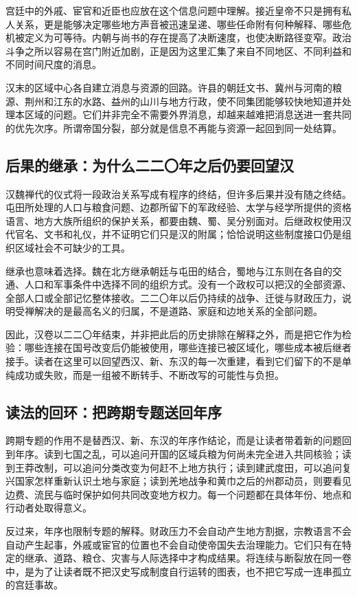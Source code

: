 宫廷中的外戚、宦官和近臣也应放在这个信息问题中理解。接近皇帝不只是拥有私人关系，更是能够决定哪些地方声音被迅速呈递、哪些任命附有何种解释、哪些危机被定义为可等待。内朝与尚书的存在提高了决断速度，也使决断路径变窄。政治斗争之所以容易在宫门附近加剧，正是因为这里汇集了来自不同地区、不同利益和不同时间尺度的消息。

汉末的区域中心各自建立消息与资源的回路。许县的朝廷文书、冀州与河南的粮源、荆州和江东的水路、益州的山川与地方行政，使不同集团能够较快地知道并处理本区域的问题。它们并非完全不需要外界消息，却越来越难把消息送进一套共同的优先次序。所谓帝国分裂，部分就是信息不再能与资源一起回到同一处结算。

\subsection{后果的继承：为什么二二〇年之后仍要回望汉}

汉魏禅代的仪式将一段政治关系写成有程序的终结，但许多后果并没有随之终结。屯田所处理的人口与粮食问题、边郡所留下的军政经验、太学与经学所提供的资格语言、地方大族所组织的保护关系，都要由魏、蜀、吴分别面对。后继政权使用汉代官名、文书和礼仪，并不证明它们只是汉的附属；恰恰说明这些制度接口仍是组织区域社会不可缺少的工具。

继承也意味着选择。魏在北方继承朝廷与屯田的结合，蜀地与江东则在各自的交通、人口和军事条件中选择不同的组织方式。没有一个政权可以把汉的全部资源、全部人口或全部记忆整体接收。二二〇年以后仍持续的战争、迁徙与财政压力，说明受禅解决的是最高名义的归属，不是道路、家庭和边地关系的全部问题。

因此，汉卷以二二〇年结束，并非把此后的历史排除在解释之外，而是把它作为检验：哪些连接在国号改变后仍能被使用，哪些连接已被区域化，哪些成本被后继者接手。读者在这里可以回望西汉、新、东汉的每一次重建，看到它们留下的不是单纯成功或失败，而是一组被不断转手、不断改写的可能性与负担。

\subsection{读法的回环：把跨期专题送回年序}

跨期专题的作用不是替西汉、新、东汉的年序作结论，而是让读者带着新的问题回到年序。读到七国之乱，可以追问开国的区域兵粮为何尚未完全进入共同核验；读到王莽改制，可以追问分类改变为何赶不上地方执行；读到建武度田，可以追问复兴国家怎样重新认识土地与家庭；读到羌地战争和黄巾之后的州郡动员，则要看见边费、流民与临时保护如何共同改变地方权力。每一个问题都在具体年份、地点和行动者处取得意义。

反过来，年序也限制专题的解释。财政压力不会自动产生地方割据，宗教语言不会自动产生起事，外戚或宦官的位置也不会自动使帝国失去治理能力。它们只有在特定的继承、道路、粮仓、灾害与人际选择中才构成结果。将连续与断裂放在同一卷中，是为了让读者既不把汉史写成制度自行运转的图表，也不把它写成一连串孤立的宫廷事故。

